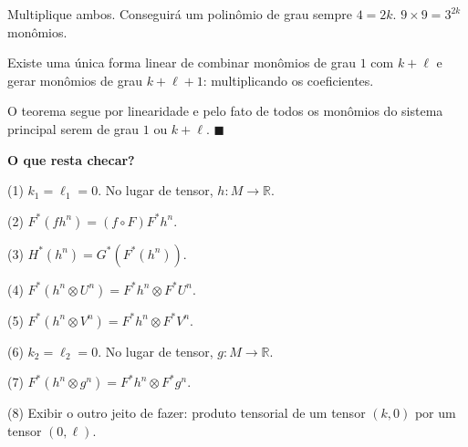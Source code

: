 \documentclass[12pt]{article}
\begin{document}
		Multiplique ambos. Conseguir\'a um polin\^omio de grau sempre $4 = 2k$. $9 \times 9 = 3^{2k}$ mon\^omios.

		Existe uma \'unica forma linear de combinar mon\^omios de grau $1$ com $k + \ell$ e gerar mon\^omios de grau $k + \ell + 1$: multiplicando os coeficientes.

		O teorema segue por linearidade e pelo fato de todos os mon\^omios do sistema principal serem de grau $1$ ou $k + \ell.\,\,\blacksquare$

		\textbf{O que resta checar?}

		(1) $k_1 = \ell_1 = 0$. No lugar de tensor, $h : M \rightarrow \mathbb{R}$.

		(2) $F^* (f h^n) = (f \circ F) F^* h^n$.

		(3) $H^*(h^n) = G^*(F^*(h^n))$.

		(4) $F^* (h^n \otimes U^n) = F^* h^n \otimes F^* U^n$.

		(5) $F^* (h^n \otimes V^n) = F^* h^n \otimes F^* V^n$.

		(6) $k_2 = \ell_2 = 0$. No lugar de tensor, $g : M \rightarrow \mathbb{R}$.

		(7) $F^* (h^n \otimes g^n) = F^* h^n \otimes F^* g^n$.

		(8) Exibir o outro jeito de fazer: produto tensorial de um tensor $(k,0)$ por um tensor $(0,\ell)$.
\end{document}
